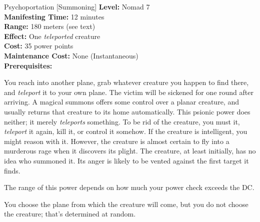 {Psychoportation [Summoning]}
{
	\textbf{Level:}
	Nomad 7\\
	\textbf{Manifesting Time:}
	12 minutes\\
	\textbf{Range:}
	180 meters (see text)\\
	\textbf{Effect:}
	One \emph{teleported} creature\\
	\textbf{Cost:}
	35 power points\\
	\textbf{Maintenance Cost:}
	None (Instantaneous)\\
	\textbf{Prerequisites:}
	\\
}
{
	You reach into another plane, grab whatever creature you happen to find there, and \emph{teleport} it to your own plane. The victim will be sickened for one round after arriving. A magical summons offers some control over a planar creature, and usually returns that creature to its home automatically. This psionic power does neither; it merely \emph{teleports} something. To be rid of the creature, you must  it, \emph{teleport} it again, kill it, or control it somehow. If the creature is intelligent, you might reason with it. However, the creature is almost certain to fly into a murderous rage when it discovers its plight. The creature, at least initially, has no idea who summoned it. Its anger is likely to be vented against the first target it finds.

	The range of this power depends on how much your power check exceeds the DC.


	You choose the plane from which the creature will come, but you do not choose the creature; that's determined at random.
}
